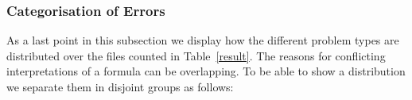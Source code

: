 \subsubsection*{Categorisation of Errors}
As a last point in this subsection we display how the different problem types are distributed over the files counted in Table~\ref{result}.   
The reasons for conflicting interpretations of a formula 
can be overlapping. 
% 
%
To be able to show a distribution we separate them in disjoint groups as follows: 

